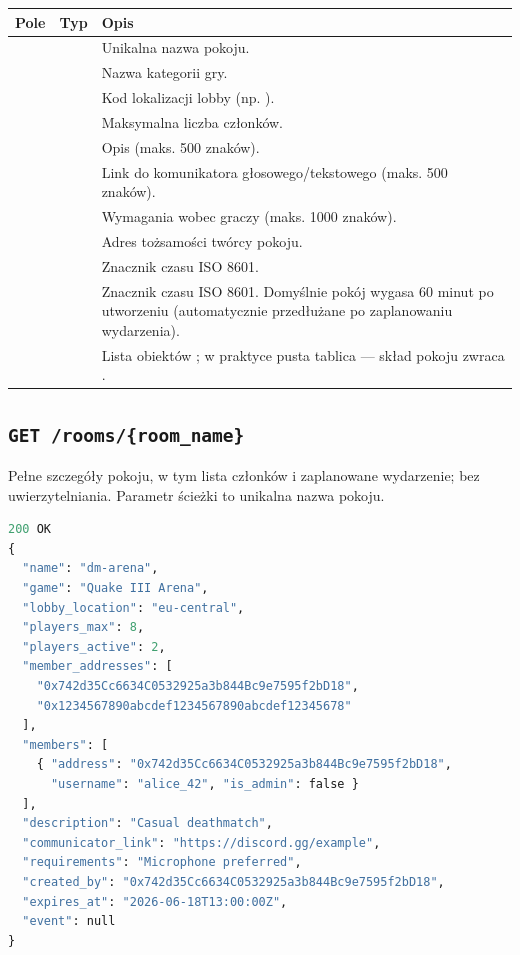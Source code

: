 \begin{tabularx}{\textwidth}{llY}
\toprule
Pole & Typ & Opis \\
\midrule
{} &  & Unikalna nazwa pokoju. \\
 &  & Nazwa kategorii gry. \\
 &  & Kod lokalizacji lobby (np. ). \\
 &  & Maksymalna liczba członków. \\
 &  & Opis (maks. 500 znaków). \\
 &  & Link do komunikatora głosowego/tekstowego (maks. 500 znaków). \\
 &  & Wymagania wobec graczy (maks. 1000 znaków). \\
 &  & Adres tożsamości twórcy pokoju. \\
 &  & Znacznik czasu ISO 8601. \\
 &  & Znacznik czasu ISO 8601. Domyślnie pokój wygasa 60 minut po utworzeniu (automatycznie przedłużane po zaplanowaniu wydarzenia). \\
 &  & Lista obiektów ; w praktyce pusta tablica --- skład pokoju zwraca . \\
\bottomrule
\end{tabularx}

\subsection{\texttt{GET /rooms/\{room\_name\}}}

Pełne szczegóły pokoju, w tym lista członków i zaplanowane wydarzenie; bez uwierzytelniania.
Parametr ścieżki  to unikalna nazwa pokoju.

\begin{lstlisting}[language=Python]
200 OK
{
  "name": "dm-arena",
  "game": "Quake III Arena",
  "lobby_location": "eu-central",
  "players_max": 8,
  "players_active": 2,
  "member_addresses": [
    "0x742d35Cc6634C0532925a3b844Bc9e7595f2bD18",
    "0x1234567890abcdef1234567890abcdef12345678"
  ],
  "members": [
    { "address": "0x742d35Cc6634C0532925a3b844Bc9e7595f2bD18",
      "username": "alice_42", "is_admin": false }
  ],
  "description": "Casual deathmatch",
  "communicator_link": "https://discord.gg/example",
  "requirements": "Microphone preferred",
  "created_by": "0x742d35Cc6634C0532925a3b844Bc9e7595f2bD18",
  "expires_at": "2026-06-18T13:00:00Z",
  "event": null
}
\end{lstlisting}


